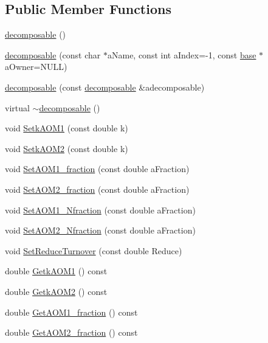 \subsection*{Public Member Functions}
\begin{DoxyCompactItemize}
\item 
\hyperlink{classdecomposable_a0010b71ca2712188527a6591a6323a06}{decomposable} ()
\item 
\hyperlink{classdecomposable_a22cfbed71b755ecaadd331c7d22cfe20}{decomposable} (const char $\ast$aName, const int aIndex=-\/1, const \hyperlink{classbase}{base} $\ast$aOwner=NULL)
\item 
\hyperlink{classdecomposable_a3a81f3d097548e761c2731c92ca50cd5}{decomposable} (const \hyperlink{classdecomposable}{decomposable} \&adecomposable)
\item 
virtual \hyperlink{classdecomposable_a370cdd448696895ac190d6b80eb41513}{$\sim$decomposable} ()
\item 
void \hyperlink{classdecomposable_a8c680d41f48b8e14d9f127f0b771836a}{SetkAOM1} (const double k)
\item 
void \hyperlink{classdecomposable_a280ab626bd4466f525db92da5018a4ff}{SetkAOM2} (const double k)
\item 
void \hyperlink{classdecomposable_ac407a798cfcb99145d49bcd70248a0a7}{SetAOM1\_\-fraction} (const double aFraction)
\item 
void \hyperlink{classdecomposable_af5a80ec735ea7df5699127e289e70409}{SetAOM2\_\-fraction} (const double aFraction)
\item 
void \hyperlink{classdecomposable_a3fff0175a3c8479d6f9e87251638e030}{SetAOM1\_\-Nfraction} (const double aFraction)
\item 
void \hyperlink{classdecomposable_a9df0927068758ebb7dc75375b241c14f}{SetAOM2\_\-Nfraction} (const double aFraction)
\item 
void \hyperlink{classdecomposable_af4673c697be4a074bd8e18375cbf5ef8}{SetReduceTurnover} (const double Reduce)
\item 
double \hyperlink{classdecomposable_aef778c85d2d909504863cb25f91c8ffe}{GetkAOM1} () const 
\item 
double \hyperlink{classdecomposable_abfebaed2dbded430bc75b4d22a54afab}{GetkAOM2} () const 
\item 
double \hyperlink{classdecomposable_a837a38c6d72b2cb26077b1c28e1c8669}{GetAOM1\_\-fraction} () const 
\item 
double \hyperlink{classdecomposable_aeebdb3853eb29223fd30bc1bf6f51189}{GetAOM2\_\-fraction} () const 

\end{DoxyCompactItemize}
